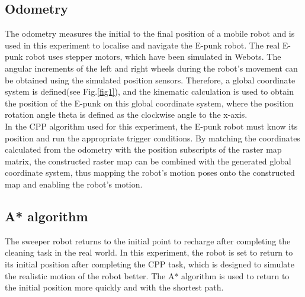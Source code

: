 \documentclass[conference]{IEEEtran}
\begin{document}
\subsection{Odometry}

The odometry measures the initial to the final position of a mobile robot and is used in this experiment to localise and navigate the E-punk robot. The real E-punk robot uses stepper motors, which have been simulated in Webots. The angular increments of the left and right wheels during the robot's movement can be obtained using the simulated position sensors. Therefore, a global coordinate system is defined(see Fig.\ref{fig1}), and the kinematic calculation\cite{dudek2010computational} is used to obtain the position of the E-punk on this global coordinate system, where the position rotation angle theta is defined as the clockwise angle to the x-axis.\\
In the CPP algorithm used for this experiment, the E-punk robot must know its position and run the appropriate trigger conditions. By matching the coordinates calculated from the odometry with the position subscripts of the raster map matrix, the constructed raster map can be combined with the generated global coordinate system, thus mapping the robot's motion poses onto the constructed map and enabling the robot's motion.

\subsection{A* algorithm}
The sweeper robot returns to the initial point to recharge after completing the cleaning task in the real world. In this experiment, the robot is set to return to its initial position after completing the CPP task, which is designed to simulate the realistic motion of the robot better. The A* algorithm\cite{hart1968formal} is used to return to the initial position more quickly and with the shortest path.\\
\end{document}

